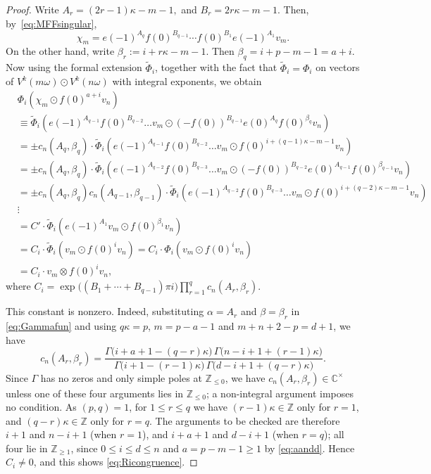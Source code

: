 \documentclass[12pt,a4paper,reqno]{amsart}
\numberwithin{equation}{section}
\theoremstyle{definition}
\newcommand{\C}{\mathbb{C}}
\newcommand{\Z}{\mathbb{Z}}
\def \al{\alpha}
\def \b{\beta}
\def\om{\omega}
\def\o{\otimes}
\def\ds{\dots}
\begin{document}
\begin{proof}
Write $A_r=(2r-1)\kappa-m-1,
$ and $
B_r=2r\kappa-m-1$. Then, by~\eqref{eq:MFFsingular},
\[
\chi_m=e(-1)^{A_q}f(0)^{B_{q-1}}\cdots f(0)^{B_1}e(-1)^{A_1}v_m.
\]
On the other hand, write $\beta_r:=i+r\kappa-m-1.$ Then $\b_q=i+p-m-1=a+i$. Now using the formal extension $\tilde\Phi_i$, together with the fact that $\tilde\Phi_i=\Phi_i$ on vectors of $V^k(m\om)\odot V^k(n\om)$ with integral exponents, we obtain
\begin{align*}
&\Phi_i(\chi_m\odot f(0)^{a+i}v_n)\\
&\equiv \tilde\Phi_i\left(e(-1)^{A_{q-1}}f(0)^{B_{q-2}}\ds v_m\odot (-f(0))^{B_{q-1}}e(0)^{A_q}f(0)^{\b_q}v_n\right)    \\
&=\pm c_n(A_q,\b_q)\cdot \tilde\Phi_i\left(e(-1)^{A_{q-1}}f(0)^{B_{q-2}}\ds v_m\odot f(0)^{i+(q-1)\kappa-m-1} v_n\right)\\
&= \pm c_n(A_q,\b_q)\cdot \tilde\Phi_i
\left(e(-1)^{A_{q-2}}f(0)^{B_{q-3}}\ds v_m\odot (-f(0))^{B_{q-2}}e(0)^{A_{q-1}}f(0)^{\b_{q-1}} v_n\right)\\
&=\pm c_n(A_q,\b_q)c_n(A_{q-1},\b_{q-1})\cdot \tilde\Phi_i\left(e(-1)^{A_{q-2}}f(0)^{B_{q-3}}\ds v_m\odot f(0)^{i+(q-2)\kappa-m-1}v_n\right)\\
&\vdots \\
&= C'\cdot\tilde\Phi_i(e(-1)^{A_1}v_m\odot f(0)^{\b_1}v_n)\\
&=C_i\cdot \tilde\Phi_i(v_m\odot f(0)^iv_n)=C_i\cdot \Phi_i(v_m\odot f(0)^iv_n)\\
&=C_i\cdot v_m\o f(0)^iv_n,
\end{align*}
where $
C_i
=
\exp\big((B_1+\cdots+B_{q-1})\pi i\big)
\prod_{r=1}^{q}
c_n(A_r,\beta_r)$.

This constant is nonzero. Indeed, substituting $\al=A_r$ and $\b=\b_r$ in \eqref{eq:Gammafun} and using $q\kappa=p$, $m=p-a-1$ and $m+n+2-p=d+1$, we have 
\[
c_n(A_r,\b_r)=\frac{\Gamma\big(i+a+1-(q-r)\kappa\big)\,\Gamma\big(n-i+1+(r-1)\kappa\big)}{\Gamma\big(i+1-(r-1)\kappa\big)\,\Gamma\big(d-i+1+(q-r)\kappa\big)}.
\]
Since $\Gamma$ has no zeros and only simple poles at $\Z_{\leq 0}$, we have $c_n(A_r,\b_r)\in \C^\times$ unless one of these four arguments lies in $\Z_{\leq 0}$; a non-integral argument imposes no condition. As $(p,q)=1$, for $1\leq r\leq q$ we have $(r-1)\kappa\in \Z$ only for $r=1$, and $(q-r)\kappa\in \Z$ only for $r=q$. The arguments to be checked are therefore $i+1$ and $n-i+1$ (when $r=1$), and $i+a+1$ and $d-i+1$ (when $r=q$); all four lie in $\Z_{\geq 1}$, since $0\leq i\leq d\leq n$ and $a=p-m-1\geq 1$ by \eqref{eq:aandd}. Hence $C_i\neq 0$, and this shows \eqref{eq:Ricongruence}.






\end{proof}
\end{document}
